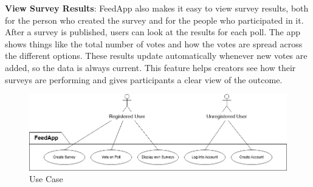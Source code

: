 \noindent
 \textbf{View Survey Results}:
FeedApp also makes it easy to view survey results, both for the person who created the survey and for the people who participated in it. After a survey is published, users can look at the results for each poll. The app shows things like the total number of votes and how the votes are spread across the different options. These results update automatically whenever new votes are added, so the data is always current. This feature helps creators see how their surveys are performing and gives participants a clear view of the outcome.

\begin{figure}[thb]
	\centering
	\includegraphics[scale=0.5]{figs/usecase.png}
	\caption{Use Case}
	\label{fig:usecase}
\end{figure}


